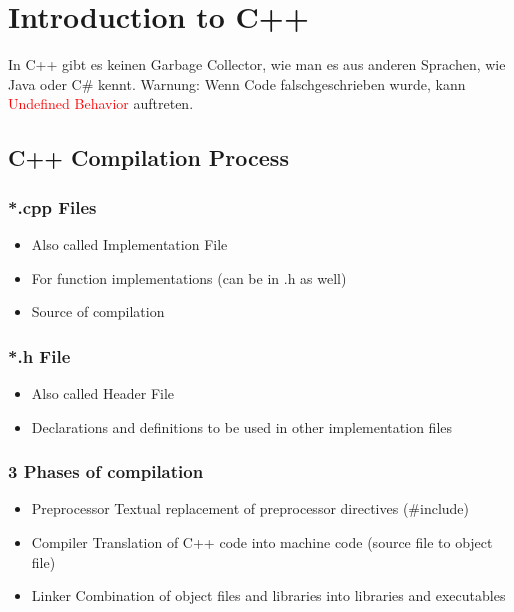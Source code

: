 
\section{Introduction to C++}

In C++ gibt es keinen Garbage Collector, wie man es aus anderen Sprachen, wie Java oder C\# kennt. Warnung: Wenn Code \dq falsch\dq geschrieben wurde, kann \textcolor{red}{Undefined Behavior} auftreten.

\subsection{C++ Compilation Process}
\subsubsection{*.cpp Files}
\begin{itemize}
    \item Also called Implementation File
    \item For function implementations (can be in .h as well)
    \item Source of compilation
\end{itemize}
\subsubsection{*.h File}
\begin{itemize}
    \item Also called Header File
    \item Declarations and definitions to be used in other implementation files
\end{itemize}

\subsubsection{3 Phases of compilation}
\begin{itemize}
    \item Preprocessor Textual replacement of preprocessor directives (#include)
    \item Compiler Translation of C++ code into machine code (source file to object file)
    \item Linker Combination of object files and libraries into libraries and executables
\end{itemize}

